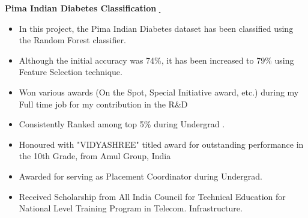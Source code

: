 \documentclass[10pt,a4paper,ragged2e]{classfile}
\let\orighref\href
\renewcommand{\href}[2]{\orighref{#1}{#2\,\faExternalLink}}
\begin{document}
\textbf{Pima Indian Diabetes Classification}
\href{https://github.com/Niloy-Chakraborty/Pima_Indian_Diabetes_Classification}{}
\begin{itemize}[label=\textcolor{blue}{\textbullet}]
\item In this project, the Pima Indian Diabetes dataset has been
classified using the Random Forest classifier. 
\item Although the initial accuracy was 74\%, it has been increased to 79\% using Feature Selection technique. 

\end{itemize}



\begin{itemize}[label=\textcolor{blue}{\textbullet}]
    \item  Won various awards (On the Spot, Special Initiative award, etc.) during my Full time job for my contribution in the R\&D
    \item Consistently Ranked among top 5\% during Undergrad .
    \item Honoured with "VIDYASHREE" titled award for outstanding performance in the 10th Grade, from Amul Group, India
    \item Awarded for serving as Placement Coordinator during Undergrad.
    \item Received Scholarship from All India Council for Technical Education for National Level Training Program in Telecom. Infrastructure.


\end{itemize}
\end{document}
